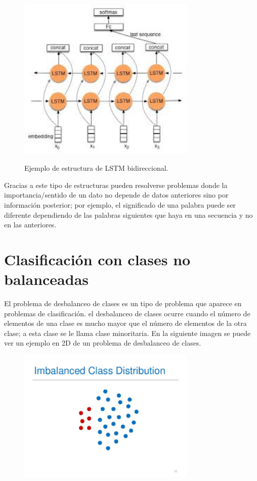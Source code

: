 \begin{figure}[h]
	\centering
	\includegraphics[width=85mm]{imagenes/bidi-lstm.jpg}
	\label{fig:2}
	\caption{Ejemplo de estructura de LSTM bidireccional.}
\end{figure}
\verticalspace
Gracias a este tipo de estructuras pueden resolverse problemas donde la importancia/sentido de un dato no depende de datos anteriores sino por información posterior; por ejemplo, el significado de una palabra puede ser diferente dependiendo de las palabras siguientes que haya en una secuencia y no en las anteriores.
\newpage
\section{Clasificación con clases no balanceadas}
El problema de desbalanceo de clases es un tipo de problema que aparece en problemas de clasificación. el desbalanceo de clases ocurre cuando el número de elementos de una clase es mucho mayor que el número de elementos de la otra clase; a esta clase se le llama clase minoritaria. En la siguiente imagen se puede ver un ejemplo en 2D de un problema de desbalanceo de clases.\newline

\begin{figure}[h]
	\centering
	\includegraphics[width=85mm]{imagenes/imbalance_class.png}
	\label{fig:3}
	
\end{figure}
\verticalspace

